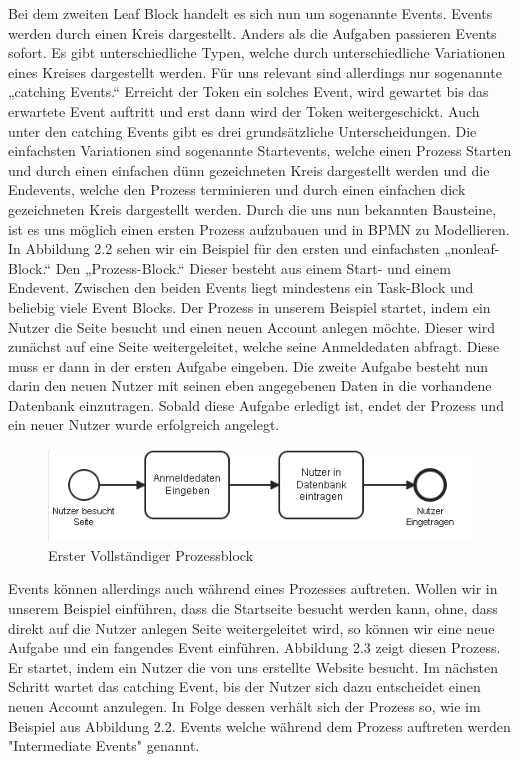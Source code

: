 Bei dem zweiten Leaf Block handelt es sich nun um sogenannte Events. Events werden durch einen Kreis dargestellt. Anders als die Aufgaben passieren Events sofort. Es gibt unterschiedliche Typen, welche durch unterschiedliche Variationen eines Kreises dargestellt werden. Für uns relevant sind allerdings nur sogenannte „catching Events.“ Erreicht der Token ein solches Event, wird gewartet bis das erwartete Event auftritt und erst dann wird der Token weitergeschickt. Auch unter den catching Events gibt es drei grundsätzliche Unterscheidungen. Die einfachsten Variationen sind sogenannte Startevents, welche einen Prozess Starten und durch einen einfachen dünn gezeichneten Kreis dargestellt werden und die Endevents, welche den Prozess terminieren und durch einen einfachen dick gezeichneten Kreis dargestellt werden. 
Durch die uns nun bekannten Bausteine, ist es uns möglich einen ersten Prozess aufzubauen und in BPMN zu Modellieren. In Abbildung 2.2 sehen wir ein Beispiel für den ersten und einfachsten „nonleaf-Block.“ Den „Prozess-Block.“ Dieser besteht aus einem Start- und einem Endevent. Zwischen den beiden Events liegt mindestens ein Task-Block und beliebig viele Event Blocks. Der Prozess in unserem Beispiel startet, indem ein Nutzer die Seite besucht und einen neuen Account anlegen möchte. Dieser wird zunächst auf eine Seite weitergeleitet, welche seine Anmeldedaten abfragt. Diese muss er dann in der ersten Aufgabe eingeben. Die zweite Aufgabe besteht nun darin den neuen Nutzer mit seinen eben angegebenen Daten in die vorhandene Datenbank einzutragen. Sobald diese Aufgabe erledigt ist, endet der Prozess und ein neuer Nutzer wurde erfolgreich angelegt. 

\begin{figure}
\centering
\includegraphics[width=15cm]{Figures/Beispiel2}
\decoRule
\caption[Prozess Block]{Erster Vollständiger Prozessblock}
\label{fig:Task}
\end{figure}

Events können allerdings auch während eines Prozesses auftreten. Wollen wir in unserem Beispiel einführen, dass die Startseite besucht werden kann, ohne, dass direkt auf die Nutzer anlegen Seite weitergeleitet wird, so können wir eine neue Aufgabe und ein fangendes Event einführen. Abbildung 2.3 zeigt diesen Prozess. Er startet, indem ein Nutzer die von uns erstellte Website besucht. Im nächsten Schritt wartet das catching Event, bis der Nutzer sich dazu entscheidet einen neuen Account anzulegen. In Folge dessen verhält sich der Prozess so, wie im Beispiel aus Abbildung 2.2. Events welche während dem Prozess auftreten werden "Intermediate Events" genannt.

